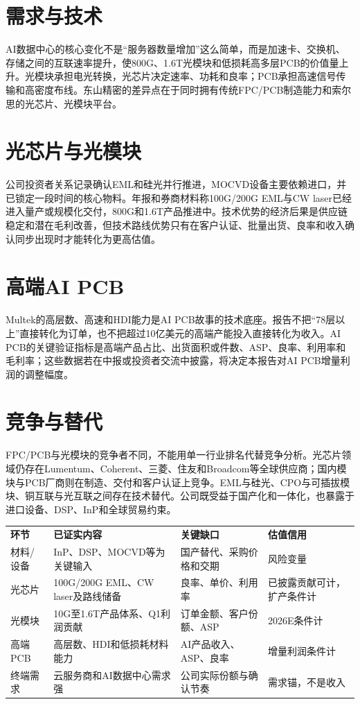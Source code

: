 
\section{需求与技术}
AI数据中心的核心变化不是“服务器数量增加”这么简单，而是加速卡、交换机、存储之间的互联速率提升，使800G、1.6T光模块和低损耗高多层PCB的价值量上升。光模块承担电光转换，光芯片决定速率、功耗和良率；PCB承担高速信号传输和高密度布线。东山精密的差异点在于同时拥有传统FPC/PCB制造能力和索尔思的光芯片、光模块平台。

\section{光芯片与光模块}
公司投资者关系记录确认EML和硅光并行推进，MOCVD设备主要依赖进口，并已锁定一段时间的核心物料。年报和券商材料称100G/200G EML与CW laser已经进入量产或规模化交付，800G和1.6T产品推进中。技术优势的经济后果是供应链稳定和潜在毛利改善，但技术路线优势只有在客户认证、批量出货、良率和收入确认同步出现时才能转化为更高估值。

\section{高端AI PCB}
Multek的高层数、高速和HDI能力是AI PCB故事的技术底座。报告不把“78层以上”直接转化为订单，也不把超过10亿美元的高端产能投入直接转化为收入。AI PCB的关键验证指标是高端产品占比、出货面积或件数、ASP、良率、利用率和毛利率；这些数据若在中报或投资者交流中披露，将决定本报告对AI PCB增量利润的调整幅度。

\section{竞争与替代}
FPC/PCB与光模块的竞争者不同，不能用单一行业排名代替竞争分析。光芯片领域仍存在Lumentum、Coherent、三菱、住友和Broadcom等全球供应商；国内模块与PCB厂商则在制造、交付和客户认证上竞争。EML与硅光、CPO与可插拔模块、铜互联与光互联之间存在技术替代。公司既受益于国产化和一体化，也暴露于进口设备、DSP、InP和全球贸易约束。

\begin{exhibitbox}
\begin{tabularx}{\exhibitboxwidth}{L{3.0cm}X L{3.0cm}X}
\textbf{环节} & \textbf{已证实内容} & \textbf{关键缺口} & \textbf{估值信用} \\
材料/设备 & InP、DSP、MOCVD等为关键输入 & 国产替代、采购价格和交期 & 风险变量 \\
光芯片 & 100G/200G EML、CW laser及路线储备 & 良率、单价、利用率 & 已披露贡献可计，扩产条件计 \\
光模块 & 10G至1.6T产品体系、Q1利润贡献 & 订单金额、客户份额、ASP & 2026E条件计 \\
高端PCB & 高层数、HDI和低损耗材料能力 & AI产品收入、ASP、良率 & 增量利润条件计 \\
终端需求 & 云服务商和AI数据中心需求强 & 公司实际份额与确认节奏 & 需求锚，不是收入 \\
\end{tabularx}
\end{exhibitbox}

